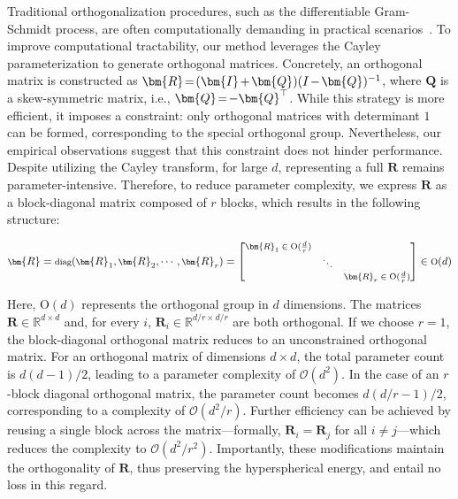Traditional orthogonalization procedures, such as the differentiable Gram-Schmidt process, are often computationally demanding in practical scenarios~\cite{liu2021orthogonal}. To improve computational tractability, our method leverages the Cayley parameterization to generate orthogonal matrices. Concretely, an orthogonal matrix is constructed as $\thickmuskip=2mu \medmuskip=2mu \bm{R}=(\bm{I}+\bm{Q})(I-\bm{Q})^{-1}$, where $\bm{Q}$ is a skew-symmetric matrix, i.e., $\thickmuskip=2mu \medmuskip=2mu \bm{Q}=-\bm{Q}^\top$. While this strategy is more efficient, it imposes a constraint: only orthogonal matrices with determinant $1$ can be formed, corresponding to the special orthogonal group. Nevertheless, our empirical observations suggest that this constraint does not hinder performance. Despite utilizing the Cayley transform, for large $d$, representing a full $\bm{R}$ remains parameter-intensive. Therefore, to reduce parameter complexity, we express $\bm{R}$ as a block-diagonal matrix composed of $r$ blocks, which results in the following structure:

\begin{equation}
    \footnotesize
    \bm{R}=\text{diag}(\bm{R}_1,\bm{R}_2,\cdots,\bm{R}_r)=\begin{bmatrix}
    \bm{R}_1\in \text{O}(\frac{d}{r}) &  &\\
    &\ddots & \\
    & & \bm{R}_r\in \text{O}(\frac{d}{r})
    \end{bmatrix}\in \text{O}(d)
\end{equation}

Here, $\text{O}(d)$ represents the orthogonal group in $d$ dimensions. The matrices $\bm{R}\in\mathbb{R}^{d\times d}$ and, for every $i$, $\bm{R}_i\in\mathbb{R}^{d/r\times d/r}$ are both orthogonal. If we choose $r=1$, the block-diagonal orthogonal matrix reduces to an unconstrained orthogonal matrix. For an orthogonal matrix of dimensions $d\times d$, the total parameter count is $d(d-1)/2$, leading to a parameter complexity of $\mathcal{O}(d^2)$. In the case of an $r$-block diagonal orthogonal matrix, the parameter count becomes $d(d/r-1)/2$, corresponding to a complexity of $\mathcal{O}(d^2/r)$. Further efficiency can be achieved by reusing a single block across the matrix—formally, $\bm{R}_i=\bm{R}_j$ for all $i\neq j$—which reduces the complexity to $\mathcal{O}(d^2/r^2)$. Importantly, these modifications maintain the orthogonality of $\bm{R}$, thus preserving the hyperspherical energy, and entail no loss in this regard.


